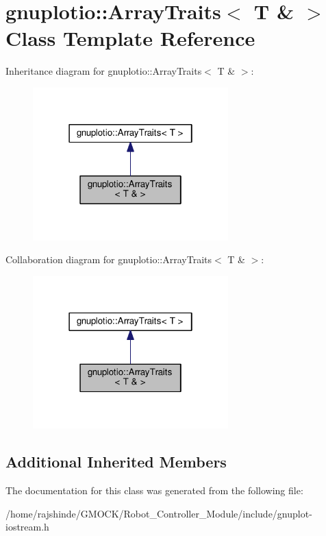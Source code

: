 \hypertarget{classgnuplotio_1_1_array_traits_3_01_t_01_6_01_4}{}\section{gnuplotio\+:\+:Array\+Traits$<$ T \& $>$ Class Template Reference}
\label{classgnuplotio_1_1_array_traits_3_01_t_01_6_01_4}


Inheritance diagram for gnuplotio\+:\+:Array\+Traits$<$ T \& $>$\+:
\nopagebreak
\begin{figure}[H]
\begin{center}
\leavevmode
\includegraphics[width=214pt]{classgnuplotio_1_1_array_traits_3_01_t_01_6_01_4__inherit__graph}
\end{center}
\end{figure}


Collaboration diagram for gnuplotio\+:\+:Array\+Traits$<$ T \& $>$\+:
\nopagebreak
\begin{figure}[H]
\begin{center}
\leavevmode
\includegraphics[width=214pt]{classgnuplotio_1_1_array_traits_3_01_t_01_6_01_4__coll__graph}
\end{center}
\end{figure}
\subsection*{Additional Inherited Members}


The documentation for this class was generated from the following file\+:\begin{DoxyCompactItemize}
\item 
/home/rajshinde/\+G\+M\+O\+C\+K/\+Robot\+\_\+\+Controller\+\_\+\+Module/include/gnuplot-\/iostream.\+h\end{DoxyCompactItemize}
